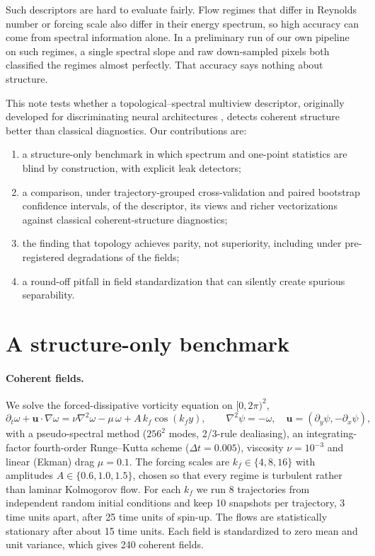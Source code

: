 \documentclass[11pt,a4paper]{article}
\begin{document}
Such descriptors are hard to evaluate fairly. Flow regimes that differ in
Reynolds number or forcing scale also differ in their energy spectrum, so
high accuracy can come from spectral information alone. In a preliminary run
of our own pipeline on such regimes, a single spectral slope and raw
down-sampled pixels both classified the regimes almost perfectly. That
accuracy says nothing about structure.

This note tests whether a topological--spectral multiview descriptor,
originally developed for discriminating neural architectures
\cite{multiview}, detects coherent structure better than classical
diagnostics. Our contributions are:
\begin{enumerate}
\item a structure-only benchmark in which spectrum and one-point statistics
  are blind by construction, with explicit leak detectors;
\item a comparison, under trajectory-grouped cross-validation and paired
  bootstrap confidence intervals, of the descriptor, its views and richer
  vectorizations against classical coherent-structure diagnostics;
\item the finding that topology achieves parity, not superiority, including
  under pre-registered degradations of the fields;
\item a round-off pitfall in field standardization that can silently create
  spurious separability.
\end{enumerate}

\section{A structure-only benchmark}

\paragraph{Coherent fields.} We solve the forced-dissipative vorticity
equation on $[0,2\pi)^2$,
\begin{equation}
\partial_t\omega + \mathbf{u}\cdot\nabla\omega
  = \nu\nabla^2\omega - \mu\,\omega + A\,k_f\cos(k_f y),
\qquad \nabla^2\psi=-\omega,\quad \mathbf{u}=(\partial_y\psi,-\partial_x\psi),
\end{equation}
with a pseudo-spectral method ($256^2$ modes, 2/3-rule dealiasing), an
integrating-factor fourth-order Runge--Kutta scheme ($\Delta t=0.005$), viscosity
$\nu=10^{-3}$ and linear (Ekman) drag $\mu=0.1$. The forcing scales are
$k_f\in\{4,8,16\}$ with amplitudes $A\in\{0.6,1.0,1.5\}$, chosen so that every
regime is turbulent rather than laminar Kolmogorov flow. For each $k_f$ we run 8
trajectories from independent random initial conditions and keep 10 snapshots
per trajectory, 3 time units apart, after 25 time units of spin-up. The flows
are statistically stationary after about 15 time units. Each field is
standardized to zero mean and unit variance, which gives 240 coherent fields.
\end{document}

